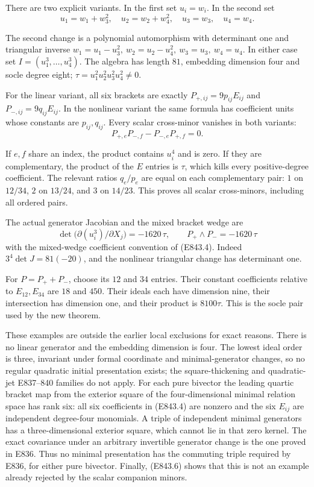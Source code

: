 There are two explicit variants. In the first set \(u_i=w_i\).
In the second set
\[
 u_1=w_1+w_3^2,\quad u_2=w_2+w_4^2,\quad u_3=w_3,\quad u_4=w_4.
 \tag{E843.5}
\]

The second change is a polynomial automorphism with determinant one
and triangular inverse
\(w_1=u_1-u_3^2,\ w_2=u_2-u_4^2,\ w_3=u_3,\ w_4=u_4\).
In either case set \(I=(u_1^3,\ldots,u_4^3)\).
The algebra has length \(81\), embedding dimension four and socle degree
eight; \(\tau=u_1^2u_2^2u_3^2u_4^2\ne0\).

For the linear variant, all six brackets are exactly
\(P_{+,ij}=9p_{ij}E_{ij}\) and \(P_{-,ij}=9q_{ij}E_{ij}\).
In the nonlinear variant the same formula has coefficient units whose
constants are \(p_{ij},q_{ij}\).
Every scalar cross-minor vanishes in both variants:
\[
                  P_{+,e}P_{-,f}-P_{-,e}P_{+,f}=0.
 \tag{E843.6}
\]

If \(e,f\) share an index, the product contains \(u_i^4\) and is zero.
If they are complementary, the product of the \(E\) entries is \(\tau\),
which kills every positive-degree coefficient.
The relevant ratios \(q_e/p_e\) are equal on each complementary pair:
\(1\) on \(12/34\), \(2\) on \(13/24\), and \(3\) on \(14/23\).
This proves all scalar cross-minors, including all ordered pairs.

The actual generator Jacobian and the mixed bracket wedge are
\[
 \det\bigl(\partial(u_i^3)/\partial X_j\bigr)
       =-1620\,\tau,\qquad
                P_+\wedge P_-=-1620\,\tau
 \tag{E843.7}
\]
with the mixed-wedge coefficient convention of (E843.4).
Indeed \(3^4\det J=81(-20)\), and the nonlinear triangular change
has determinant one.

For \(P=P_++P_-\), choose its \(12\) and \(34\) entries.
Their constant coefficients relative to \(E_{12},E_{34}\) are \(18\)
and \(450\). Their ideals each have dimension nine, their intersection
has dimension one, and their product is \(8100\tau\).
This is the socle pair used by the new theorem.

These examples are outside the earlier local exclusions for exact reasons.
There is no linear generator and the embedding dimension is four.
The lowest ideal order is three, invariant under formal coordinate
and minimal-generator changes, so no regular quadratic initial presentation
exists; the square-thickening and quadratic-jet E837--840 families do not apply.
For each pure bivector the leading quartic bracket map from the exterior
square of the four-dimensional minimal relation space has rank six:
all six coefficients in (E843.4) are nonzero and the six \(E_{ij}\)
are independent degree-four monomials.
A triple of independent minimal generators has a three-dimensional exterior
square, which cannot lie in that zero kernel.
The exact covariance under an arbitrary invertible generator change is
the one proved in E836. Thus no minimal presentation has the commuting
triple required by E836, for either pure bivector.
Finally, (E843.6) shows that this is not an example already rejected
by the scalar companion minors.

